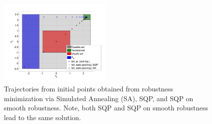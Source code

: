 


\begin{figure}[t]
\centering
\includegraphics[width=0.49\textwidth]{figures/ToyExampleFalse}
\caption{Trajectories from initial points obtained from robustness minimization via Simulated Annealing (SA), SQP, and SQP on smooth robustness. Note, both SQP and SQP on smooth robustness lead to the same solution.}
\label{fig:toy falisification}
\end{figure}